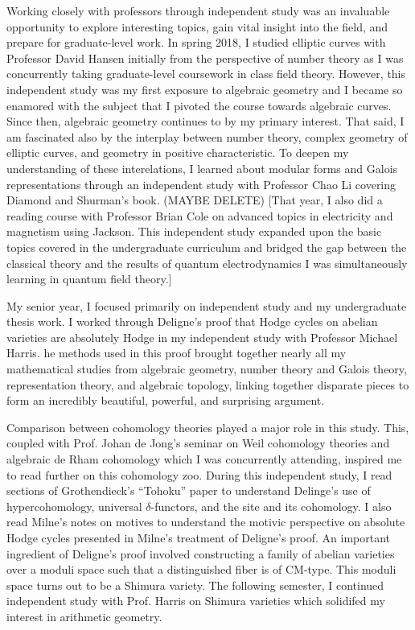 \documentclass[10pt]{amsart}
\begin{document}
Working closely with professors through independent study was an invaluable opportunity to explore interesting topics, gain vital insight into the field, and prepare for graduate-level work. In spring 2018, I studied elliptic curves with Professor David Hansen initially from the perspective of number theory as I was concurrently taking graduate-level coursework in class field theory. However, this independent study was my first exposure to algebraic geometry and I became so enamored with the subject that I pivoted the course towards algebraic curves. Since then, algebraic geometry continues to by my primary interest. That said, I am fascinated also by the interplay between number theory, complex geometry of elliptic curves, and geometry in positive characteristic. To deepen my understanding of these interelations, I learned about modular forms and Galois representations through an independent study with Professor Chao Li covering Diamond and Shurman's book. (MAYBE DELETE) [That year, I also did a reading course with Professor Brian Cole on advanced topics in electricity and magnetism using Jackson. This independent study expanded upon the basic topics covered in the undergraduate curriculum and bridged the gap between the classical theory and the results of quantum electrodynamics I was simultaneously learning in quantum field theory.] 
\par
My senior year, I focused primarily on independent study and my undergraduate thesis work. I worked through Deligne's proof that Hodge cycles on abelian varieties are absolutely Hodge in my independent study with Professor Michael Harris. he methods used in this proof brought together nearly all my mathematical studies from algebraic geometry, number theory and Galois theory, representation theory, and algebraic topology, linking together disparate pieces to form an incredibly beautiful, powerful, and surprising argument. 

Comparison between cohomology theories played a major role in this study. This, coupled with Prof. Johan de Jong's seminar on Weil cohomology theories and algebraic de Rham cohomology which I was concurrently attending, inspired me to read further on this cohomology zoo. During this independent study, I read sections of Grothendieck's ``Tohoku'' paper to understand Delinge's use of hypercohomology, universal $\delta$-functors, and the \etale site and its cohomology. I also read Milne's notes on motives to understand the motivic perspective on absolute Hodge cycles presented in Milne's treatment of Deligne's proof. An important ingredient of Deligne's proof involved constructing a family of abelian varieties over a moduli space such that a distinguished fiber is of CM-type. This moduli space turns out to be a Shimura variety. The following semester, I continued independent study with Prof. Harris on Shimura varieties which solidifed my interest in arithmetic geometry. 
\end{document}

